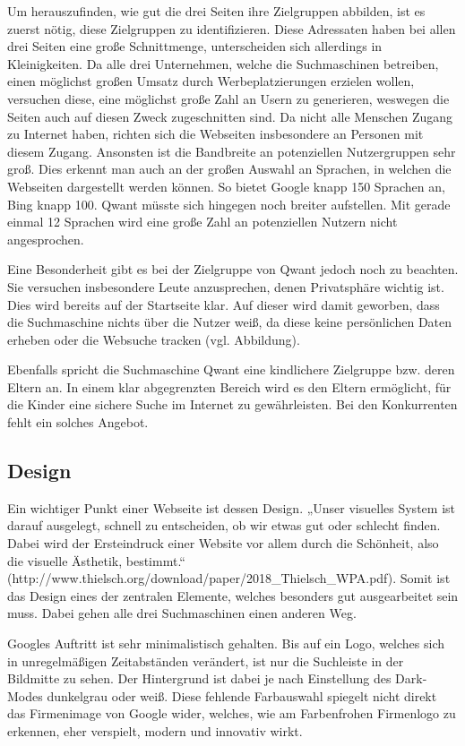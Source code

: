 \documentclass[11pt]{article}
\begin{document}
Um herauszufinden, wie gut die drei Seiten ihre Zielgruppen abbilden, ist es zuerst nötig, diese Zielgruppen zu
identifizieren. Diese Adressaten haben bei allen drei Seiten eine große Schnittmenge, unterscheiden sich allerdings in
Kleinigkeiten. Da alle drei Unternehmen, welche die Suchmaschinen betreiben, einen möglichst großen Umsatz durch Werbeplatzierungen
erzielen wollen, versuchen diese, eine möglichst große Zahl an Usern zu generieren, weswegen die Seiten auch auf diesen Zweck
zugeschnitten sind.  Da nicht alle Menschen Zugang zu Internet haben, richten sich die Webseiten insbesondere an Personen
mit diesem Zugang. Ansonsten ist die Bandbreite an potenziellen Nutzergruppen sehr groß. Dies erkennt man auch an der großen
Auswahl an Sprachen, in welchen die Webseiten dargestellt werden können. So bietet Google knapp 150 Sprachen an, Bing
knapp 100. Qwant müsste sich hingegen noch breiter aufstellen. Mit gerade einmal 12 Sprachen wird eine große Zahl an
potenziellen Nutzern nicht angesprochen.

Eine Besonderheit gibt es bei der Zielgruppe von Qwant jedoch noch zu beachten. Sie versuchen insbesondere Leute anzusprechen,
denen Privatsphäre wichtig ist. Dies wird bereits auf der Startseite klar. Auf dieser wird damit geworben, dass die Suchmaschine
nichts über die Nutzer weiß, da diese keine persönlichen Daten erheben oder die Websuche tracken (vgl. Abbildung).

Ebenfalls spricht die Suchmaschine Qwant eine kindlichere Zielgruppe bzw. deren Eltern an. In einem klar abgegrenzten
Bereich wird es den Eltern ermöglicht, für die Kinder eine sichere Suche im Internet zu gewährleisten. Bei den Konkurrenten
fehlt ein solches Angebot.

\subsection{Design}
Ein wichtiger Punkt einer Webseite ist dessen Design. „Unser visuelles System ist darauf ausgelegt, schnell zu entscheiden,
ob wir etwas gut oder schlecht finden. Dabei wird der Ersteindruck einer Website vor allem durch die Schönheit, also die
visuelle Ästhetik, bestimmt.“ (http://www.thielsch.org/download/paper/2018\_Thielsch\_WPA.pdf). Somit ist das Design eines
der zentralen Elemente, welches besonders gut ausgearbeitet sein muss. Dabei gehen alle drei Suchmaschinen einen anderen Weg.

Googles Auftritt ist sehr minimalistisch gehalten. Bis auf ein Logo, welches sich in unregelmäßigen Zeitabständen verändert,
ist nur die Suchleiste in der Bildmitte zu sehen. Der Hintergrund ist dabei je nach Einstellung des Dark-Modes dunkelgrau
oder weiß. Diese fehlende Farbauswahl spiegelt nicht direkt das Firmenimage von Google wider, welches, wie am Farbenfrohen
Firmenlogo zu erkennen, eher verspielt, modern und innovativ wirkt.
\end{document}
